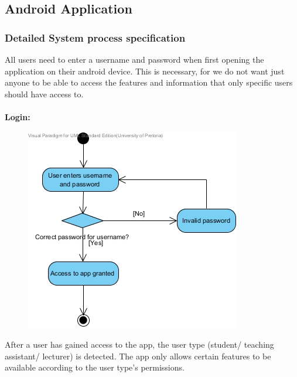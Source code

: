 \documentclass[12pt,a4paper]{article}
\begin{document}
\subsection{Android Application}
\subsubsection{Detailed System process specification}
All users need to enter a username and password when first opening the application on their android device.  This is necessary, for we do not want just anyone to be able to access the features and information that only specific users should have access to.\\\\
\textbf {Login:}
\begin{figure}[h]
\begin{center}
\includegraphics[scale=0.7]{./AndroidActivityDiagrams/ActivityDiagram1.jpg}
\end{center}
\end{figure}

After a user has gained access to the app, the user type (student/ teaching assistant/ lecturer) is detected.  The app only allows certain features to be available according to the user type\textquoteright s permissions.
\\
\end{document}
